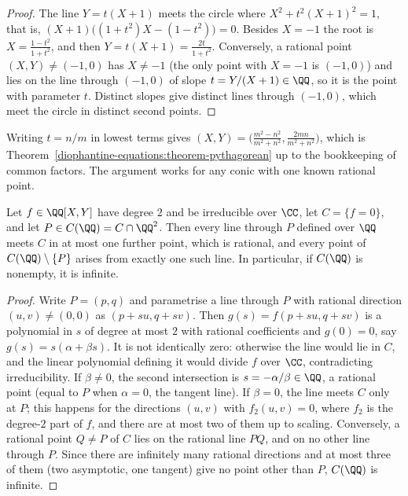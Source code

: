\begin{proof}
The line $Y = t(X + 1)$ meets the circle where $X^2 + t^2(X + 1)^2 = 1$, that is, $(X + 1)\bigl((1 + t^2)X - (1 - t^2)\bigr) = 0$. Besides $X = -1$ the root is $X = \frac{1 - t^2}{1 + t^2}$, and then
$Y = t(X + 1) = \frac{2t}{1 + t^2}$. Conversely, a rational point $(X, Y) \neq (-1, 0)$ has $X \neq -1$ (the only point with $X = -1$ is $(-1, 0)$) and lies on the line through $(-1, 0)$ of slope
$t = Y/(X + 1) \in \QQ$, so it is the point with parameter $t$. Distinct slopes give distinct lines through $(-1, 0)$, which meet the circle in distinct second points.
\end{proof}

Writing $t = n/m$ in lowest terms gives $(X, Y) = \bigl(\frac{m^2 - n^2}{m^2 + n^2}, \frac{2mn}{m^2 + n^2}\bigr)$, which is Theorem~\ref{diophantine-equations:theorem-pythagorean} up to the bookkeeping of
common factors. The argument works for any conic with one known rational point.

\begin{proposition}\label{diophantine-equations:proposition-conic}
Let $f \in \QQ[X, Y]$ have degree $2$ and be irreducible over $\CC$, let $C = \{f = 0\}$, and let $P \in C(\QQ) = C \cap \QQ^2$. Then every line through $P$ defined over $\QQ$ meets $C$ in at most one further
point, which is rational, and every point of $C(\QQ) \setminus \{P\}$ arises from exactly one such line. In particular, if $C(\QQ)$ is nonempty, it is infinite.
\end{proposition}

\begin{proof}
Write $P = (p, q)$ and parametrise a line through $P$ with rational direction $(u, v) \neq (0, 0)$ as $(p + su, q + sv)$. Then $g(s) = f(p + su, q + sv)$ is a polynomial in $s$ of degree at most $2$ with
rational coefficients and $g(0) = 0$, say $g(s) = s(\alpha + \beta s)$. It is not identically zero: otherwise the line would lie in $C$, and the linear polynomial defining it would divide $f$ over $\CC$,
contradicting irreducibility. If $\beta \neq 0$, the second intersection is $s = -\alpha/\beta \in \QQ$, a rational point (equal to $P$ when $\alpha = 0$, the tangent line). If $\beta = 0$, the line meets $C$
only at $P$; this happens for the directions $(u, v)$ with $f_2(u, v) = 0$, where $f_2$ is the degree-$2$ part of $f$, and there are at most two of them up to scaling. Conversely, a rational point $Q \neq P$ of $C$
lies on the rational line $PQ$, and on no other line through $P$. Since there are infinitely many rational directions and at most three of them (two asymptotic, one tangent) give no point other than $P$,
$C(\QQ)$ is infinite.
\end{proof}

